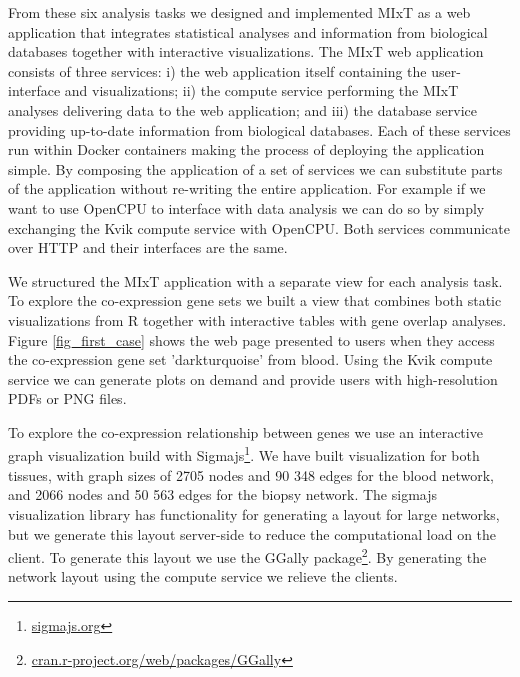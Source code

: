 From these six analysis tasks we designed and implemented MIxT as a web
application that integrates statistical analyses and information from biological
databases together with interactive visualizations.
The MIxT web application
consists of three services: i) the web application itself containing the
user-interface and visualizations; ii) the compute service performing the MIxT
analyses delivering data to the web application; and iii) the database service
providing up-to-date information from biological databases. Each of these
services run within Docker containers making the process of deploying the
application simple. 
By composing the
application of a set of services we can substitute parts of the application
without re-writing the entire application.
For example if we want to use OpenCPU to interface with data analysis we can do
so by simply exchanging the Kvik compute service with OpenCPU. Both services
communicate over HTTP and their interfaces are the same. 

We structured the MIxT application with a separate view for each analysis task.
To explore the co-expression gene sets we built a view that combines both static
visualizations from R together with interactive tables with gene overlap
analyses. Figure \ref{fig_first_case} shows the web page presented to users when
they access the co-expression gene set 'darkturquoise' from blood. Using the
Kvik compute service we can generate plots on demand and provide users with
high-resolution PDFs or PNG files. 

To explore the co-expression relationship between genes we use an interactive
graph visualization build with Sigmajs\footnote{\url{sigmajs.org}}. We have
built visualization for both tissues, with graph sizes of 2705 nodes and 90 348
edges for the blood network, and 2066 nodes and 50 563 edges for the biopsy
network. The sigmajs visualization library has functionality for generating a
layout for large networks, but we generate this layout server-side to reduce the
computational load on the client. To generate this layout we use the GGally
package\footnote{\url{cran.r-project.org/web/packages/GGally}}. By generating
the network layout using the compute service we relieve the clients.

